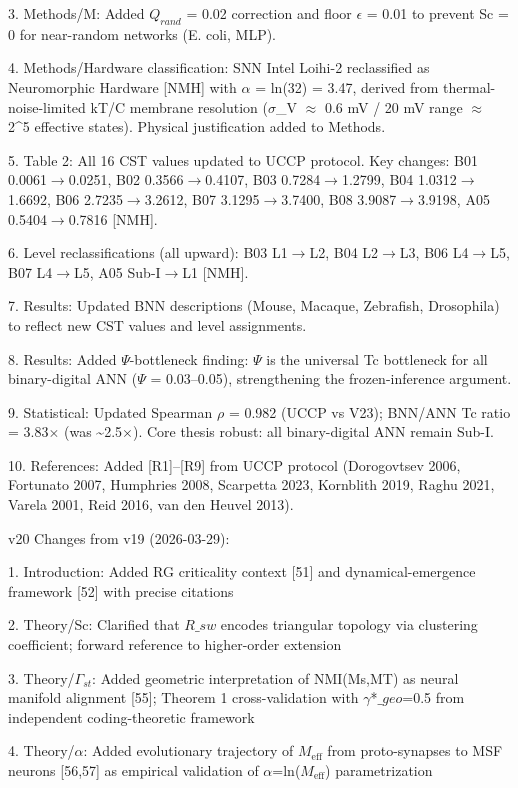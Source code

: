 \documentclass[a4paper,12pt]{article}
\begin{document}
3. Methods/M: Added $Q_{rand}$ = 0.02 correction and floor $\epsilon$ = 0.01 to prevent Sc = 0 for near-random networks (E. coli, MLP).

4. Methods/Hardware classification: SNN Intel Loihi-2 reclassified as Neuromorphic Hardware [NMH] with $\alpha$ = ln(32) = 3.47, derived from thermal-noise-limited kT/C membrane resolution ($\sigma$_V $\approx$ 0.6 mV / 20 mV range $\approx$ 2^5 effective states). Physical justification added to Methods.

5. Table 2: All 16 CST values updated to UCCP protocol. Key changes: B01 0.0061$\rightarrow$0.0251, B02 0.3566$\rightarrow$0.4107, B03 0.7284$\rightarrow$1.2799, B04 1.0312$\rightarrow$1.6692, B06 2.7235$\rightarrow$3.2612, B07 3.1295$\rightarrow$3.7400, B08 3.9087$\rightarrow$3.9198, A05 0.5404$\rightarrow$0.7816 [NMH].

6. Level reclassifications (all upward): B03 L1$\rightarrow$L2, B04 L2$\rightarrow$L3, B06 L4$\rightarrow$L5, B07 L4$\rightarrow$L5, A05 Sub-I$\rightarrow$L1 [NMH].

7. Results: Updated BNN descriptions (Mouse, Macaque, Zebrafish, Drosophila) to reflect new CST values and level assignments.

8. Results: Added $\Psi$-bottleneck finding: $\Psi$ is the universal Tc bottleneck for all binary-digital ANN ($\Psi$ = 0.03--0.05), strengthening the frozen-inference argument.

9. Statistical: Updated Spearman $\rho$ = 0.982 (UCCP vs V23); BNN/ANN Tc ratio = 3.83$\times$ (was \textasciitilde{}2.5$\times$). Core thesis robust: all binary-digital ANN remain Sub-I.

10. References: Added [R1]--[R9] from UCCP protocol (Dorogovtsev 2006, Fortunato 2007, Humphries 2008, Scarpetta 2023, Kornblith 2019, Raghu 2021, Varela 2001, Reid 2016, van den Heuvel 2013).

v20 Changes from v19 (2026-03-29):

1. Introduction: Added RG criticality context [51] and dynamical-emergence framework [52] with precise citations

2. Theory/Sc: Clarified that $R\_{sw}$ encodes triangular topology via clustering coefficient; forward reference to higher-order extension

3. Theory/$\Gamma_{st}$: Added geometric interpretation of NMI(Ms,MT) as neural manifold alignment [55]; Theorem 1 cross-validation with $\gamma$*$\_geo$=0.5 from independent coding-theoretic framework

4. Theory/$\alpha$: Added evolutionary trajectory of $M_{\text{eff}}$ from proto-synapses to MSF neurons [56,57] as empirical validation of $\alpha$=ln($M_{\text{eff}}$) parametrization
\end{document}
